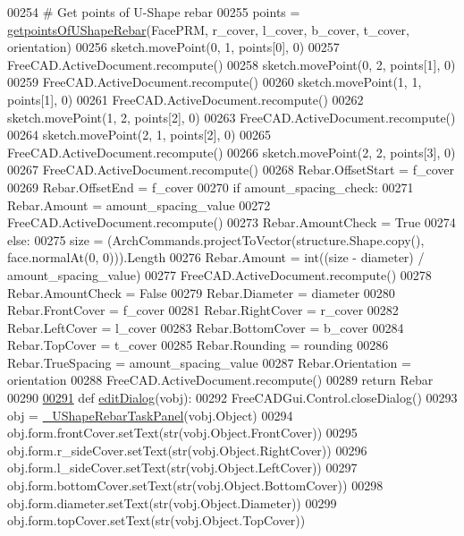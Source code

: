 \begin{DoxyCode}
00254     \textcolor{comment}{# Get points of U-Shape rebar}
00255     points = \hyperlink{namespaceUShapeRebar_ac12ae9bce6b5211759f2fff4091b0221}{getpointsOfUShapeRebar}(FacePRM, r\_cover, l\_cover, b\_cover, t\_cover, 
      orientation)
00256     sketch.movePoint(0, 1, points[0], 0)
00257     FreeCAD.ActiveDocument.recompute()
00258     sketch.movePoint(0, 2, points[1], 0)
00259     FreeCAD.ActiveDocument.recompute()
00260     sketch.movePoint(1, 1, points[1], 0)
00261     FreeCAD.ActiveDocument.recompute()
00262     sketch.movePoint(1, 2, points[2], 0)
00263     FreeCAD.ActiveDocument.recompute()
00264     sketch.movePoint(2, 1, points[2], 0)
00265     FreeCAD.ActiveDocument.recompute()
00266     sketch.movePoint(2, 2, points[3], 0)
00267     FreeCAD.ActiveDocument.recompute()
00268     Rebar.OffsetStart = f\_cover
00269     Rebar.OffsetEnd = f\_cover
00270     \textcolor{keywordflow}{if} amount\_spacing\_check:
00271         Rebar.Amount = amount\_spacing\_value
00272         FreeCAD.ActiveDocument.recompute()
00273         Rebar.AmountCheck = \textcolor{keyword}{True}
00274     \textcolor{keywordflow}{else}:
00275         size = (ArchCommands.projectToVector(structure.Shape.copy(), face.normalAt(0, 0))).Length
00276         Rebar.Amount = int((size - diameter) / amount\_spacing\_value)
00277         FreeCAD.ActiveDocument.recompute()
00278         Rebar.AmountCheck = \textcolor{keyword}{False}
00279     Rebar.Diameter = diameter
00280     Rebar.FrontCover = f\_cover
00281     Rebar.RightCover = r\_cover
00282     Rebar.LeftCover = l\_cover
00283     Rebar.BottomCover = b\_cover
00284     Rebar.TopCover = t\_cover
00285     Rebar.Rounding = rounding
00286     Rebar.TrueSpacing = amount\_spacing\_value
00287     Rebar.Orientation = orientation
00288     FreeCAD.ActiveDocument.recompute()
00289     \textcolor{keywordflow}{return} Rebar
00290 
\hypertarget{UShapeRebar_8py_source.tex_l00291}{}\hyperlink{namespaceUShapeRebar_a16038a29bc4b605b909e4946d2e022ff}{00291} \textcolor{keyword}{def }\hyperlink{namespaceUShapeRebar_a16038a29bc4b605b909e4946d2e022ff}{editDialog}(vobj):
00292     FreeCADGui.Control.closeDialog()
00293     obj = \hyperlink{classUShapeRebar_1_1__UShapeRebarTaskPanel}{\_UShapeRebarTaskPanel}(vobj.Object)
00294     obj.form.frontCover.setText(str(vobj.Object.FrontCover))
00295     obj.form.r\_sideCover.setText(str(vobj.Object.RightCover))
00296     obj.form.l\_sideCover.setText(str(vobj.Object.LeftCover))
00297     obj.form.bottomCover.setText(str(vobj.Object.BottomCover))
00298     obj.form.diameter.setText(str(vobj.Object.Diameter))
00299     obj.form.topCover.setText(str(vobj.Object.TopCover))

\end{DoxyCode}
